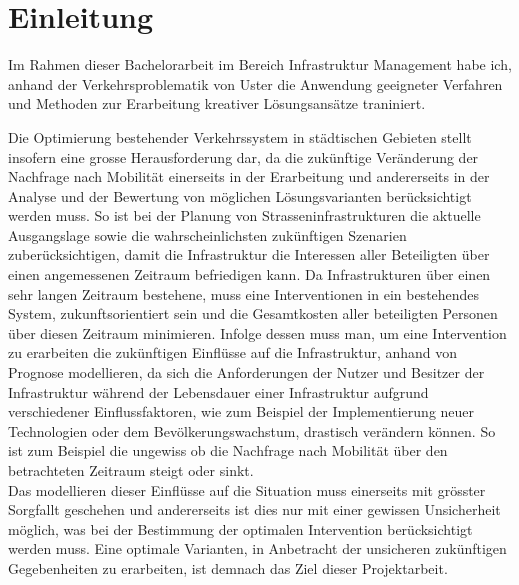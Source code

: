 %
%            
%
%
%

\chapter{Einleitung}
\label{chap:Einleitung}

Im Rahmen dieser Bachelorarbeit im Bereich Infrastruktur Management habe ich, anhand der Verkehrsproblematik von Uster die Anwendung geeigneter Verfahren und Methoden zur Erarbeitung kreativer Lösungsansätze traniniert.

Die Optimierung bestehender Verkehrssystem in städtischen Gebieten stellt insofern eine grosse Herausforderung dar, da die zukünftige Veränderung der Nachfrage nach Mobilität einerseits in der Erarbeitung und andererseits in der Analyse und der Bewertung von möglichen Lösungsvarianten berücksichtigt werden muss. So ist bei der Planung von Strasseninfrastrukturen die aktuelle Ausgangslage sowie die wahrscheinlichsten zukünftigen Szenarien zuberücksichtigen, damit die Infrastruktur die Interessen aller Beteiligten über einen angemessenen Zeitraum befriedigen kann. Da Infrastrukturen über einen sehr langen Zeitraum bestehene, muss eine Interventionen in ein bestehendes System, zukunftsorientiert sein und die Gesamtkosten aller beteiligten Personen über diesen Zeitraum minimieren. Infolge dessen muss man, um eine Intervention zu erarbeiten die zukünftigen Einflüsse auf die Infrastruktur, anhand von Prognose modellieren, da sich die Anforderungen der Nutzer und Besitzer der Infrastruktur während der Lebensdauer einer Infrastruktur aufgrund verschiedener Einflussfaktoren, wie zum Beispiel der Implementierung neuer Technologien oder dem Bevölkerungswachstum, drastisch verändern können. So ist zum Beispiel die ungewiss ob die Nachfrage nach Mobilität über den betrachteten Zeitraum steigt oder sinkt. \\
Das modellieren dieser Einflüsse auf die Situation muss einerseits mit grösster Sorgfallt geschehen und andererseits ist dies nur mit einer gewissen Unsicherheit möglich, was bei der Bestimmung der optimalen Intervention berücksichtigt werden muss. Eine optimale Varianten, in Anbetracht der unsicheren zukünftigen Gegebenheiten zu erarbeiten, ist demnach das Ziel dieser Projektarbeit. 

